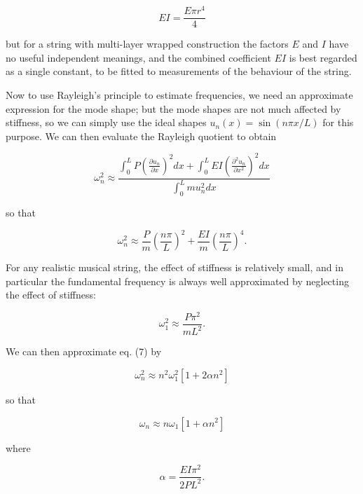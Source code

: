   $$EI=\dfrac{E \pi r^4}{4} \tag{5}$$ 

  but for a string with multi-layer wrapped construction the factors $E$ and 
  $I$ have no useful independent meanings, and the combined coefficient $EI$ is 
  best regarded as a single constant, to be fitted to measurements of the 
  behaviour of the string. 

  Now to use Rayleigh's principle to estimate frequencies, we need an 
  approximate expression for the mode shape; but the mode shapes are not much 
  affected by stiffness, so we can simply use the ideal shapes $u_n(x)=\sin(n 
  \pi x/L)$ for this purpose. We can then evaluate the Rayleigh quotient to 
  obtain 

  $$\omega_n^2 \approx \dfrac{\int_0^L{P \left(\frac{\partial u_n}{\partial 
  x}\right)^2} dx + \int_0^L{E I \left(\frac{\partial^2 u_n}{\partial 
  x^2}\right)^2} dx}{\int_0^L{m u_n^2} dx} \tag{6}$$ 

  so that 

  $$\omega_n^2 \approx \dfrac{P}{m} \left(\dfrac{n \pi}{L}\right)^2 + 
  \dfrac{EI}{m} \left(\dfrac{n \pi}{L}\right)^4 . \tag{7}$$ 

  For any realistic musical string, the effect of stiffness is relatively 
  small, and in particular the fundamental frequency is always well 
  approximated by neglecting the effect of stiffness: 

  $$\omega_1^2 \approx \dfrac{P \pi^2}{mL^2} . \tag{8}$$ 

  We can then approximate eq. (7) by 

  $$\omega_n^2 \approx n^2 \omega_1^2 \left[1 + 2 \alpha n^2 \right] \tag{9}$$ 

  so that 

  $$\omega_n \approx n \omega_1 \left[1 + \alpha n^2 \right] \tag{10}$$ 

  where 

  $$\alpha= \dfrac{EI \pi^2}{2P L^2} . \tag{11}$$ 
